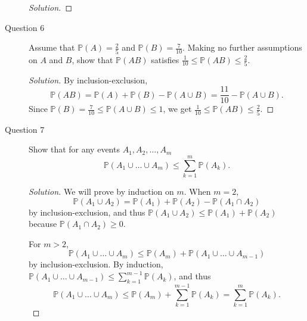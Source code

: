 \documentclass[addpoints, 11pt]{exam}
\newcommand*{\prob}{\mathds{P}}
\begin{document}
\begin{description}
\begin{proof}[Solution]
    \end{proof}

    \newpage

    \item[Question 6]  Assume that $\prob(A) = \frac{2}{5}$ and $\prob(B) = \frac{7}{10}$. Making no further assumptions on $A$ and $B$, show that $\prob(AB)$ satisfies $\frac{1}{10} \leq \prob(AB) \leq \frac{2}{5}$.
    
    \begin{proof}[Solution] 
        By inclusion-exclusion, 
        \[
            \prob(AB) = \prob(A) + \prob(B) - \prob(A \cup B) = \frac{11}{10} - \prob(A \cup B).
        \]
        Since $\prob(B) = \frac{7}{10} \leq \prob(A \cup B) \leq 1$, we get $\frac{1}{10} \leq \prob(AB) \leq \frac{2}{5}$.
    \end{proof}

    \newpage

    \item[Question 7] Show that for any events $A_1, A_2, \dots, A_m$
    \[
        \prob(A_1 \cup \dots \cup A_m) \leq \sum^m_{k = 1} \prob(A_k).
    \]
    
    \begin{proof}[Solution] 
        We will prove by induction on $m$. When $m = 2$, 
        \[
            \prob(A_1 \cup A_2) = \prob(A_1) + \prob(A_2) - \prob(A_1 \cap A_2)
        \]
        by inclusion-exclusion, and thus $\prob(A_1 \cup A_2) \leq \prob(A_1) + \prob(A_2)$ because $\prob(A_1 \cap A_2) \geq 0$. 
        
        For $m > 2$, 
        \[
            \prob(A_1 \cup \dots \cup A_m) \leq \prob(A_m) + \prob(A_1 \cup \dots \cup A_{m-1})
        \]
        by inclusion-exclusion. By induction, $\prob(A_1 \cup \dots \cup A_{m-1}) \leq \sum^{m-1}_{k = 1} \prob(A_k)$, and thus 
        \[
            \prob(A_1 \cup \dots \cup A_m) \leq \prob(A_m) + \sum^{m-1}_{k = 1} \prob(A_k) = \sum^m_{k = 1} \prob(A_k).
        \]
    \end{proof}

    
\end{description}
\end{document}

